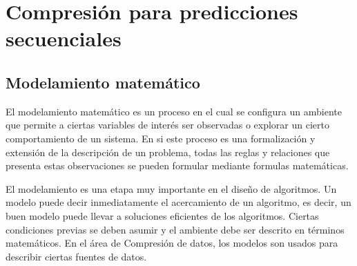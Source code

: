 \uncm
\section{Compresión para predicciones secuenciales}\label{ch2:compressdata-predict-seq}


\uncm



\subsection{Modelamiento matemático}\label{sec-ldc-model-math}

El modelamiento matemático es un proceso en el cual se configura un ambiente que permite a ciertas variables de interés ser observadas o explorar un cierto comportamiento  de un sistema. En si este proceso es una formalización y extensión de la descripción de un problema, todas las reglas y relaciones que presenta estas observaciones se pueden formular mediante formulas matemáticas.

El modelamiento es una etapa muy importante en el diseño de algoritmos. Un modelo puede decir inmediatamente el acercamiento de un algoritmo, es decir, un  buen modelo puede llevar a soluciones eficientes de los algoritmos. Ciertas condiciones previas se deben asumir y el ambiente debe ser descrito  en términos matemáticos. En el área de Compresión de datos, los modelos son usados para describir ciertas fuentes de datos.



